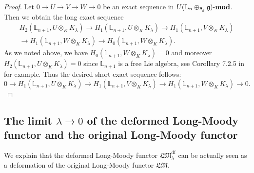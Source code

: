 \documentclass[a4paper,12pt]{article}
\theoremstyle{definition}
\theoremstyle{remark}
\begin{document}
\begin{proof}
Let $0\to U \to V \to W \to 0$ be an exact sequence in $U(\mathbb{L}_{n}\oplus_{\theta_{g}} \mathfrak{g})\text{-\textbf{mod}}$.
Then we obtain the long exact sequence 
\begin{multline*}
			H_{2}(\mathbb{L}_{n+1}, U\otimes_{K} K_{\lambda}) \to H_{1}(\mathbb{L}_{n+1}, U\otimes_{K} K_{\lambda}) \to H_{1}(\mathbb{L}_{n+1}, V\otimes_{K} K_{\lambda})\\
			\to H_{1}(\mathbb{L}_{n+1}, W\otimes_{K} K_{\lambda}) \to H_{0}(\mathbb{L}_{n+1}, W\otimes_{K} K_{\lambda}).
\end{multline*}
As we noted above, we have $H_{0}(\mathbb{L}_{n+1}, W\otimes_{K} K_{\lambda})=0$ and 
moreover $H_{2}(\mathbb{L}_{n+1}, U\otimes_{K} K_{\lambda})=0$ since $\mathbb{L}_{n+1}$ is a free Lie algebra, see Corollary 7.2.5 in \cite{Wei94} for example.
Thus the desired short exact sequence follows:
\[
0\to H_{1}(\mathbb{L}_{n+1}, U\otimes_{K} K_{\lambda}) \to H_{1}(\mathbb{L}_{n+1}, V\otimes_{K} K_{\lambda}) \to H_{1}(\mathbb{L}_{n+1}, W\otimes_{K} K_{\lambda}) \to 0.
\]	
\end{proof}

\subsection{The limit $\lambda\to 0$ of the deformed Long-Moody functor and the original Long-Moody functor}
We explain that the deformed Long-Moody functor $\mathfrak{LM}^{\mathrm{df}}_{\lambda}$ can be actually seen as 
a deformation of the original Long-Moody functor $\mathfrak{LM}$.
\end{document}
